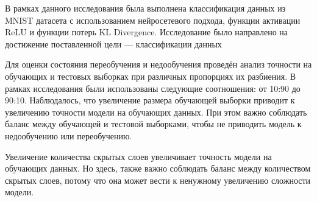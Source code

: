 
В рамках данного исследования была выполнена классификация данных из MNIST датасета с использованием нейросетевого подхода, 
функции активации ReLU и функции потерь KL Divergence. 
Исследование было направлено на достижение поставленной цели — классификации данных

Для оценки состояния переобучения и недообучения проведён анализ точности на обучающих и тестовых выборках при различных пропорциях их разбиения. 
В рамках исследования были использованы следующие соотношения: от 10:90 до 90:10. 
Наблюдалось, что увеличение размера обучающей выборки приводит к увеличению точности модели на обучающих данных. 
При этом важно соблюдать баланс между обучающей и тестовой выборками, чтобы не приводить модель к недообучению или переобучению.

Увеличение количества скрытых слоев увеличивает точность модели на обучающих данных. 
Но здесь, также важно соблюдать баланс между количеством скрытых слоев, потому что она может вести к ненужному увеличению сложности модели.